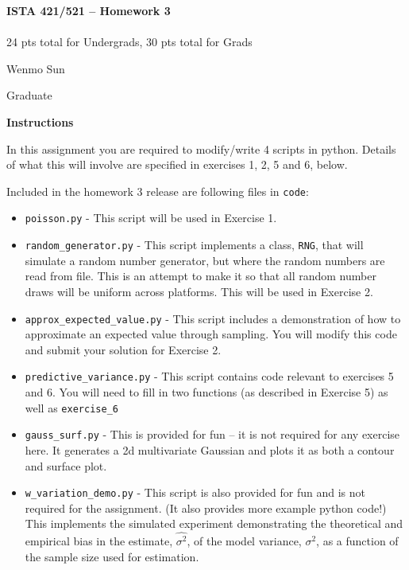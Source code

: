 \documentclass[10pt]{article}
\begin{document}
\begin{center}
    {\Large {\bf ISTA 421/521 -- Homework 3}} \\
     \\
    24 pts total for Undergrads, 30 pts total for Grads
    
\end{center}

\begin{flushright}
Wenmo Sun%

Graduate %
\end{flushright}

\vspace{1cm}
{\Large {\bf Instructions}}

In this assignment you are required to modify/write 4 scripts in python.  Details of what this will involve are specified in exercises 1, 2, 5 and 6, below.

Included in the homework 3 release are following files in {\tt code}:
\begin{itemize}
\item{\tt poisson.py} - This script will be used in Exercise 1.
\item{\tt random\_generator.py} - This script implements a class, {\tt RNG}, that will simulate a random number generator, but where the random numbers are read from file. This is an attempt to make it so that all random number draws will be uniform across platforms. This will be used in Exercise 2.
\item {\tt approx\_expected\_value.py} - This script includes a demonstration of how to approximate an expected value through sampling.  You will modify this code and submit your solution for Exercise 2.
\item {\tt predictive\_variance.py} - This script contains code relevant to exercises 5 and 6. You will need to fill in two functions (as described in Exercise 5) as well as {\tt exercise\_6}
\item {\tt gauss\_surf.py} - This is provided for fun -- it is not required for any exercise here.  It generates a 2d multivariate Gaussian and plots it as both a contour and surface plot.
\item {\tt w\_variation\_demo.py} - This script is also provided for fun and is not required for the assignment. (It also provides more example python code!)  This implements the simulated experiment demonstrating the theoretical and empirical bias in the estimate, $\widehat{\sigma^2}$, of the model variance, $\sigma^2$, as a function of the sample size used for estimation.
\end{itemize}
\end{document}

